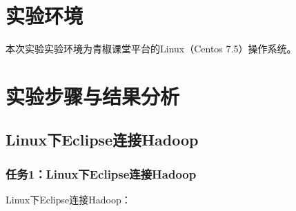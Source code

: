 \documentclass {article}
\begin{document}
	\section{实验环境}
		本次实验实验环境为青椒课堂平台的Linux（Centos 7.5）操作系统。
	
	\section{实验步骤与结果分析}
		\subsection{Linux下Eclipse连接Hadoop}
			\subsubsection{任务1：Linux下Eclipse连接Hadoop}
				Linux下Eclipse连接Hadoop：
\end{document}
